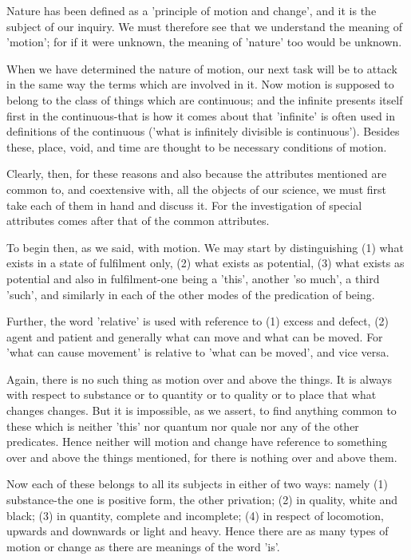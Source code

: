 Nature has been defined as a 'principle of motion and change', and
it is the subject of our inquiry. We must therefore see that we understand
the meaning of 'motion'; for if it were unknown, the meaning of 'nature'
too would be unknown. 

When we have determined the nature of motion, our next task will be
to attack in the same way the terms which are involved in it. Now
motion is supposed to belong to the class of things which are continuous;
and the infinite presents itself first in the continuous-that is how
it comes about that 'infinite' is often used in definitions of the
continuous ('what is infinitely divisible is continuous'). Besides
these, place, void, and time are thought to be necessary conditions
of motion. 

Clearly, then, for these reasons and also because the attributes mentioned
are common to, and coextensive with, all the objects of our science,
we must first take each of them in hand and discuss it. For the investigation
of special attributes comes after that of the common attributes.

To begin then, as we said, with motion. 
We may start by distinguishing (1) what exists in a state of fulfilment
only, (2) what exists as potential, (3) what exists as potential and
also in fulfilment-one being a 'this', another 'so much', a third
'such', and similarly in each of the other modes of the predication
of being. 

Further, the word 'relative' is used with reference to (1) excess
and defect, (2) agent and patient and generally what can move and
what can be moved. For 'what can cause movement' is relative to 'what
can be moved', and vice versa. 

Again, there is no such thing as motion over and above the things.
It is always with respect to substance or to quantity or to quality
or to place that what changes changes. But it is impossible, as we
assert, to find anything common to these which is neither 'this' nor
quantum nor quale nor any of the other predicates. Hence neither will
motion and change have reference to something over and above the things
mentioned, for there is nothing over and above them. 

Now each of these belongs to all its subjects in either of two ways:
namely (1) substance-the one is positive form, the other privation;
(2) in quality, white and black; (3) in quantity, complete and incomplete;
(4) in respect of locomotion, upwards and downwards or light and heavy.
Hence there are as many types of motion or change as there are meanings
of the word 'is'. 

